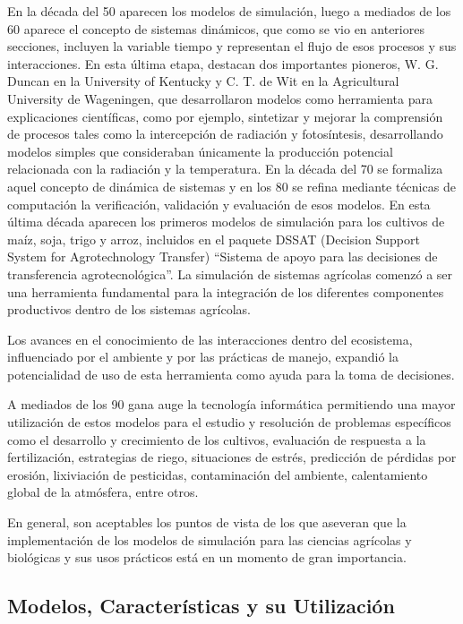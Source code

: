 En la década del 50 aparecen los modelos de simulación, luego a mediados de los 60 aparece el concepto de sistemas dinámicos, que como se vio en anteriores secciones, incluyen la variable tiempo y representan el flujo de esos procesos y sus interacciones. En esta última etapa, destacan dos importantes pioneros, W. G. Duncan en la University of Kentucky y C. T. de Wit en la Agricultural University de Wageningen, que desarrollaron modelos como herramienta para explicaciones científicas, como por ejemplo, sintetizar y mejorar la comprensión de procesos tales como la intercepción de radiación y fotosíntesis, desarrollando modelos simples que consideraban únicamente la producción potencial relacionada con la radiación y la temperatura. En la década del 70 se formaliza aquel concepto de dinámica de sistemas y en los 80 se refina mediante técnicas de computación la verificación, validación y evaluación de esos modelos. 
En esta última década aparecen los primeros modelos de simulación para los cultivos de maíz, soja, trigo y arroz, incluidos en el paquete DSSAT (Decision Support System for Agrotechnology Transfer) “Sistema de apoyo para las decisiones de transferencia agrotecnológica”.
La simulación de sistemas agrícolas comenzó a ser una herramienta fundamental para la integración de los diferentes componentes productivos dentro de los sistemas agrícolas. \parencite{hernandez2009modelos}

Los avances en el conocimiento de las interacciones dentro del ecosistema, influenciado por el ambiente y por las prácticas de manejo, expandió la potencialidad de uso de esta herramienta como ayuda para la toma de decisiones. \parencite{barrett2018humanization}

A mediados de los 90 gana auge la tecnología informática permitiendo una mayor utilización de estos modelos para el estudio y resolución de problemas específicos como el desarrollo y crecimiento de los cultivos, evaluación de respuesta a la fertilización, estrategias de riego, situaciones de estrés, predicción de pérdidas por erosión, lixiviación de pesticidas, contaminación del ambiente, calentamiento global de la atmósfera, entre otros. \parencite{guevara2007simulacion}

En general, son aceptables los puntos de vista de los que aseveran que la implementación de los modelos de simulación para las ciencias agrícolas y biológicas y sus usos prácticos está en un momento de gran importancia. \parencite{galvez2008modelacion}

\subsection{Modelos, Características y su Utilización}

